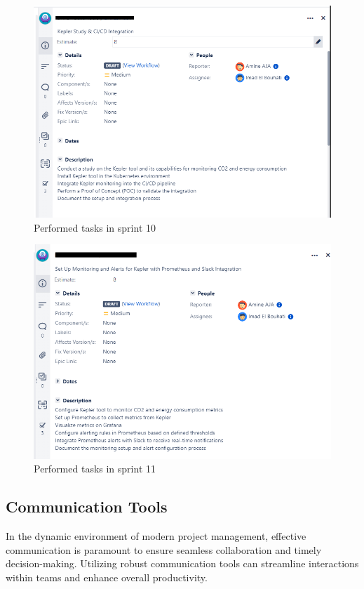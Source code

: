 \begin{figure}[H]
    \centering
    \includegraphics[width=16cm]{Figures/us-1.png}
    \caption{Performed tasks in sprint 10}
\end{figure}

\begin{figure}[H]
  \centering
  \includegraphics[width=16cm]{Figures/us-2.png}
  \caption{Performed tasks in sprint 11}
\end{figure}

\subsection{Communication Tools}

In the dynamic environment of modern project management, effective communication is paramount to ensure seamless collaboration and timely decision-making. Utilizing robust communication tools can streamline interactions within teams and enhance overall productivity.

